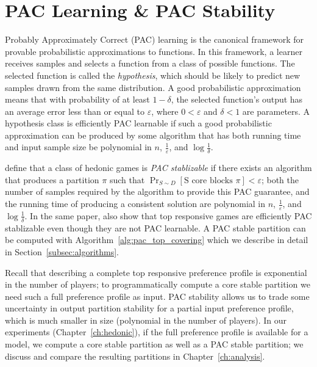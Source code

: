 \section{PAC Learning \& PAC Stability}
\label{sec:pac_learning_pac_stability}
Probably Approximately Correct (PAC) learning is the canonical framework for
provable probabilistic approximations to functions.
In this framework, a learner receives samples and selects a function from a class
of possible functions.
The selected function is called the \textit{hypothesis}, which should be likely
to predict new samples drawn from the same distribution.
A good probabilistic approximation means that with probability of at least
$1 - \delta$, the selected function's output has an average error less than or
equal to $\varepsilon$, where $0 < \varepsilon$ and $\delta < 1$ are parameters.
A hypothesis class is efficiently PAC learnable if such a good probabilistic
approximation can be produced by some algorithm that has both running time and
input sample size be polynomial in $n$, $\frac{1}{\varepsilon}$, and
$\log{\frac{1}{\delta}}$.

 define that a class of hedonic games is \textit{PAC stablizable}
if there exists an algorithm that produces a partition $\pi$ such that
$\Pr_{S\sim D}[\text{S core blocks } \pi] < \varepsilon$;
both the number of samples required by the algorithm to provide this PAC guarantee,
and the running time of producing a consistent solution are polynomial in $n$,
$\frac{1}{\varepsilon}$, and $\log{\frac{1}{\delta}}$.
In the same paper,  also show that top responsive games
are efficiently PAC stablizable even though they are not PAC learnable.
A PAC stable partition can be computed with Algorithm~\ref{alg:pac_top_covering}
which we describe in detail in Section~\ref{subsec:algorithms}.

Recall that describing a complete top responsive preference profile is exponential
in the number of players; to programmatically compute a core stable partition
we need such a full preference profile as input.
PAC stability allows us to trade some uncertainty in output partition stability
for a partial input preference profile, which is much smaller in size
(polynomial in the number of players).
In our experiments (Chapter~\ref{ch:hedonic}), if the full preference profile is
available for a model, we compute a core stable partition as well as a PAC stable
partition; we discuss and compare the resulting partitions in Chapter~\ref{ch:analysis}.